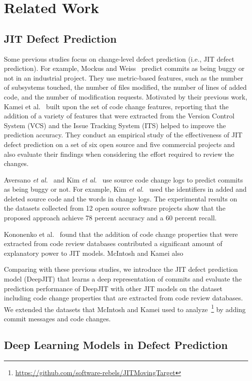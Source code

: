 \section{Related Work}
\label{sec:related}
\subsection{JIT Defect Prediction}
Some previous studies focus on change-level defect prediction (i.e., JIT defect prediction). For example, Mockus and Weiss~\cite{Mockus2000} predict commits as being buggy or not in an industrial project. They use metric-based features, such as the number of subsystems touched, the number of files modified, the number of lines of added code, and the number of modification requests. Motivated by their previous work, Kamei et al.~\cite{Kamei:2013:LES} built upon the set of code change features, reporting that the addition of a variety of features that were extracted from the Version Control System (VCS) and the Issue Tracking System (ITS) helped to improve the prediction accuracy. They conduct an empirical study of the effectiveness of JIT defect prediction on a set of six open source and five commercial projects and also evaluate their findings when considering the effort required to review the changes.

Aversano \emph{et al.}~\cite{Aversano2007} and Kim \emph{et al.}~\cite{Kim2008} use source code change logs to predict commits as being buggy or not. For example, Kim \emph{et al.}~\cite{Kim2008} used the identifiers in added and deleted source code and the words in change logs. The experimental results on the datasets collected from 12 open source software projects show that the proposed approach achieve 78 percent accuracy and a 60 percent recall.

Kononenko et al.~\cite{Kononenko:2015} found that the addition of code change properties that were extracted from code review databases contributed a significant amount of explanatory power to JIT models. McIntosh and Kamei also 

Comparing with these previous studies, we introduce the JIT defect prediction model (DeepJIT) that learns a deep representation of commits and evaluate the prediction performance of DeepJIT with other JIT models on the dataset including code change properties that are extracted from code review databases. We extended the datasets that McIntosh and Kamei used to analyze~\footnote{\url{https://github.com/software-rebels/JITMovingTarget}} by adding commit messages and code changes. 

\subsection{Deep Learning Models in Defect Prediction}



